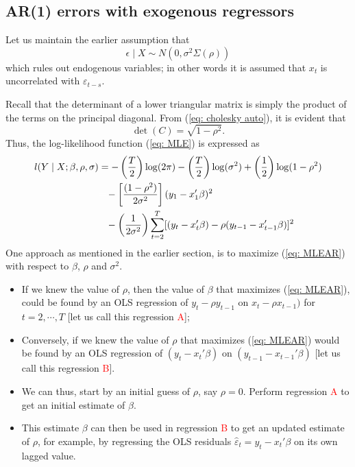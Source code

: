 \documentclass[10pt,handout,english]{beamer}
\begin{document}
\subsection{AR(1) errors with exogenous regressors}

\begin{frame}[allowframebreaks]
Let us maintain the earlier assumption that
\[
\epsilon\mid X\sim N(0,\sigma^2\Sigma(\rho))
\]
which rules out endogenous variables; in other words it is assumed that $x_t$ is uncorrelated with $\varepsilon_{t-s}$. 

Recall that the determinant of a lower triangular matrix is simply the product of the terms on the principal diagonal. From (\ref{eq: cholesky auto}), it is evident that
\[
\det(C)=\sqrt{1-\rho^2}.
\]
Thus, the log-likelihood function (\ref{eq: MLE}) is expressed as 
\begingroup
\allowdisplaybreaks
\begin{align}\label{eq: MLEAR}
\begin{split}
l(Y\mid X;\beta,\rho,\sigma)&=-\left(\frac{T}{2}\right)\log(2\pi)-\left(\frac{T}{2}\right)\log(\sigma^2)+\left(\frac{1}{2}\right)\log(1-\rho^2)\\
&\textcolor{white}{=}-\left[\frac{(1-\rho^2)}{2\sigma^2}\right](y_1-x_1'\beta)^2\\
&\textcolor{white}{=}-\left(\frac{1}{2\sigma^2}\right)\sum\limits_{t=2}^{T}[(y_t-x_t'\beta)-\rho(y_{t-1}-x_{t-1}'\beta)]^2
\end{split}
\end{align}
\endgroup
One approach as mentioned in the earlier section, is to maximize (\ref{eq: MLEAR}) with respect to $\beta$, $\rho$ and $\sigma^2$.
\begin{itemize}
\setlength\itemsep{0.5em}
\item If we knew the value of $\rho$, then the value of $\beta$ that maximizes (\ref{eq: MLEAR}), could be found by an OLS regression of $y_t-\rho y_{t-1}$ on $x_t-\rho x_{t-1})$ for $t=2,\cdots,T$ [let us call this regression \textcolor{red}{A}]; 
\item Conversely, if we knew the value of $\rho$ that maximizes (\ref{eq: MLEAR}) would be found by an OLS regression of $(y_t-x_t'\beta)$ on $(y_{t-1}-x_{t-1}'\beta)$ [let us call this regression \textcolor{red}{B}].
\item We can thus, start by an initial guess of $\rho$, say $\rho=0$. Perform regression \textcolor{red}{A} to get an initial estimate of $\beta$.
\item This estimate $\beta$ can then be used in regression \textcolor{red}{B} to get an updated estimate of $\rho$, for example, by regressing the OLS residuals $\hat{\varepsilon}_t=y_t-x_t'\beta$ on its own lagged value.

\end{itemize}
\end{frame}
\end{document}

